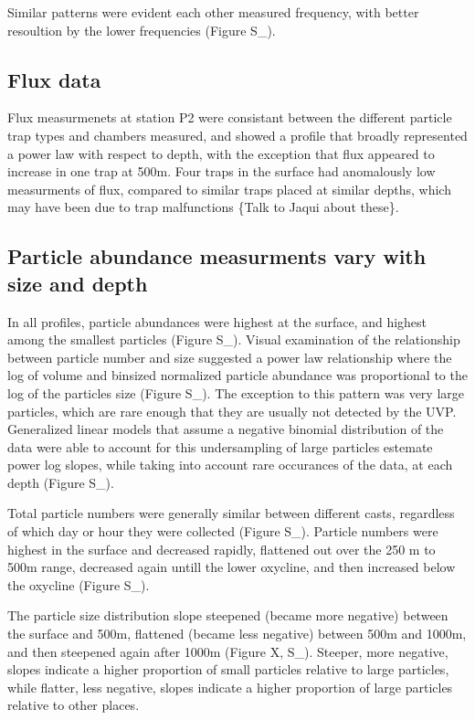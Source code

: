 \documentclass[]{article}
\begin{document}
Similar patterns were evident each other measured frequency, with better
resoultion by the lower frequencies (Figure S\_).

\hypertarget{flux-data}{%
\subsection{Flux data}\label{flux-data}}

Flux measurmenets at station P2 were consistant between the different
particle trap types and chambers measured, and showed a profile that
broadly represented a power law with respect to depth, with the
exception that flux appeared to increase in one trap at 500m. Four traps
in the surface had anomalously low measurments of flux, compared to
similar traps placed at similar depths, which may have been due to trap
malfunctions \{Talk to Jaqui about these\}.

\hypertarget{particle-abundance-measurments-vary-with-size-and-depth}{%
\subsection{Particle abundance measurments vary with size and
depth}\label{particle-abundance-measurments-vary-with-size-and-depth}}

In all profiles, particle abundances were highest at the surface, and
highest among the smallest particles (Figure S\_). Visual examination of
the relationship between particle number and size suggested a power law
relationship where the log of volume and binsized normalized particle
abundance was proportional to the log of the particles size (Figure
S\_). The exception to this pattern was very large particles, which are
rare enough that they are usually not detected by the UVP. Generalized
linear models that assume a negative binomial distribution of the data
were able to account for this undersampling of large particles estemate
power log slopes, while taking into account rare occurances of the data,
at each depth (Figure S\_).

Total particle numbers were generally similar between different casts,
regardless of which day or hour they were collected (Figure S\_).
Particle numbers were highest in the surface and decreased rapidly,
flattened out over the 250 m to 500m range, decreased again untill the
lower oxycline, and then increased below the oxycline (Figure S\_).

The particle size distribution slope steepened (became more negative)
between the surface and 500m, flattened (became less negative) between
500m and 1000m, and then steepened again after 1000m (Figure X, S\_).
Steeper, more negative, slopes indicate a higher proportion of small
particles relative to large particles, while flatter, less negative,
slopes indicate a higher proportion of large particles relative to other
places.
\end{document}
